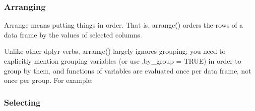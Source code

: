 \documentclass[
]{book}
\newenvironment{Shaded}{\begin{snugshade}}{\end{snugshade}}
\newcommand{\DecValTok}[1]{\textcolor[rgb]{0.00,0.00,0.81}{#1}}
\newcommand{\KeywordTok}[1]{\textcolor[rgb]{0.13,0.29,0.53}{\textbf{#1}}}
\newcommand{\NormalTok}[1]{#1}
\newcommand{\OperatorTok}[1]{\textcolor[rgb]{0.81,0.36,0.00}{\textbf{#1}}}
\newcommand{\StringTok}[1]{\textcolor[rgb]{0.31,0.60,0.02}{#1}}
\begin{document}
\hypertarget{arranging}{%
\subsubsection*{Arranging}\label{arranging}}

Arrange means putting things in order. That is, arrange() orders the rows of a data frame by the values of selected columns.

Unlike other dplyr verbs, arrange() largely ignores grouping; you need to explicitly mention grouping variables (or use .by\_group = TRUE) in order to group by them, and functions of variables are evaluated once per data frame, not once per group. For example:

\begin{Shaded}
\end{Shaded}

\hypertarget{selecting}{%
\subsubsection*{Selecting}\label{selecting}}
\end{document}
